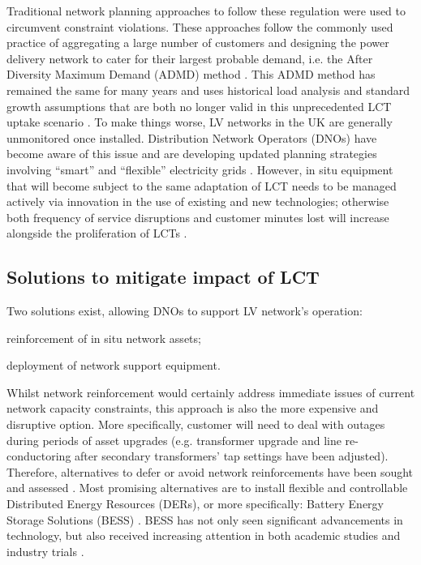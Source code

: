 Traditional network planning approaches to follow these regulation were used to circumvent constraint violations.
These approaches follow the commonly used practice of aggregating a large number of customers and designing the power delivery network to cater for their largest probable demand, i.e. the After Diversity Maximum Demand (ADMD) method \cite{Richardson2010a}.
This ADMD method has remained the same for many years and uses historical load analysis and standard growth assumptions that are both no longer valid in this unprecedented LCT uptake scenario \cite{Yunusov2016}.
To make things worse, LV networks in the UK are generally unmonitored once installed.
Distribution Network Operators (DNOs) have become aware of this issue and are developing updated planning strategies involving ``smart'' and ``flexible'' electricity grids \cite{Fang2012}.
However, in situ equipment that will become subject to the same adaptation of LCT needs to be managed actively via innovation in the use of existing and new technologies; otherwise both frequency of service disruptions and customer minutes lost will increase alongside the proliferation of LCTs \cite{Ault2008a}.

\subsection{Solutions to mitigate impact of LCT}
\label{ch-introduction:subsec:solutions-to-mitigate-impact-of-lct}

Two solutions exist, allowing DNOs to support LV network's operation: 
\begin{enumerate*}
	\item reinforcement of in situ network assets;
	\item deployment of network support equipment.
\end{enumerate*}
Whilst network reinforcement would certainly address immediate issues of current network capacity constraints, this approach is also the more expensive and disruptive option.
More specifically, customer will need to deal with outages during periods of asset upgrades (e.g. transformer upgrade and line re-conductoring after secondary transformers' tap settings have been adjusted).
Therefore, alternatives to defer or avoid network reinforcements have been sought and assessed \cite{Harrison2007, Zangs2016a, VanderKlauw2016d, Greenwood2017}.
Most promising alternatives are to install flexible and controllable Distributed Energy Resources (DERs), or more specifically: Battery Energy Storage Solutions (BESS) \cite{Wade2010}.
BESS has not only seen significant advancements in technology, but also received increasing attention in both academic studies and industry trials \cite{Palizban2016}.

